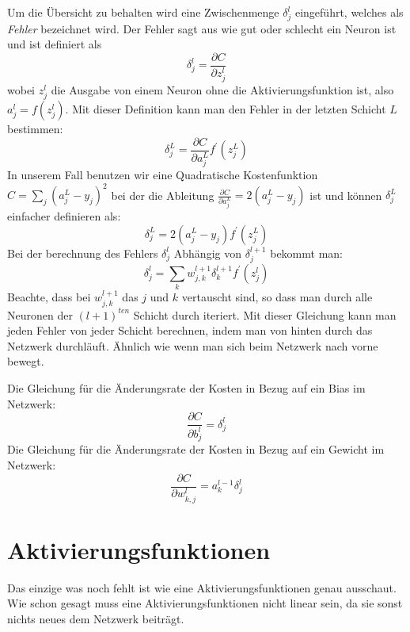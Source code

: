\documentclass[12pt,a4paper]{report}
\begin{document}
Um die Übersicht zu behalten wird eine Zwischenmenge $\delta^l_j$ eingeführt, welches als \textit{Fehler} bezeichnet wird.
Der Fehler sagt aus wie gut oder schlecht ein Neuron ist und ist definiert als
\[\delta^l_j = \frac{\partial C}{\partial z^l_j}\]
wobei $z^l_j$ die Ausgabe von einem Neuron ohne die Aktivierungsfunktion ist, also $a^l_j = f(z^l_j)$.
Mit dieser Definition kann man den Fehler in der letzten Schicht $L$ bestimmen:
\[\delta^L_j = \frac{\partial C}{\partial a^L_j}f^\prime(z^L_j)\]
In unserem Fall benutzen wir eine Quadratische Kostenfunktion $C = \sum_{j}(a^L_j - y_j)^2$ bei
der die Ableitung $\frac{\partial C}{\partial a^L_j} = 2(a^L_j - y_j)$ ist und können $\delta^L_j$ einfacher definieren als:
\[\delta^L_j = 2(a^L_j - y_j)f^\prime(z^L_j)\]
Bei der berechnung des Fehlers $\delta^l_j$ Abhängig von $\delta^{l+1}_j$ bekommt man:
\[\delta^l_j = \sum_k w^{l+1}_{j,k}\delta^{l+1}_k f^\prime(z^l_j)\]
Beachte, dass bei $w^{l+1}_{j,k}$ das $j$ und $k$ vertauscht sind, so dass man durch alle Neuronen der $(l+1)^{ten}$ Schicht durch iteriert.
Mit dieser Gleichung kann man jeden Fehler von jeder Schicht berechnen, indem man von hinten durch das Netzwerk durchläuft.
Ähnlich wie wenn man sich beim Netzwerk nach vorne bewegt.

Die Gleichung für die Änderungsrate der Kosten in Bezug auf ein Bias im Netzwerk:
\[\frac{\partial C}{\partial b^l_j} = \delta^l_j\]
Die Gleichung für die Änderungsrate der Kosten in Bezug auf ein Gewicht im Netzwerk:
\[\frac{\partial C}{\partial w^{l}_{k,j}} = a^{l-1}_k\delta^l_j\]

\section{Aktivierungsfunktionen}\label{sec:aktivierungsfunktionen}
Das einzige was noch fehlt ist wie eine Aktivierungsfunktionen genau ausschaut.
Wie schon gesagt muss eine Aktivierungsfunktionen nicht linear sein, da sie sonst nichts neues dem Netzwerk beiträgt.
\end{document}
